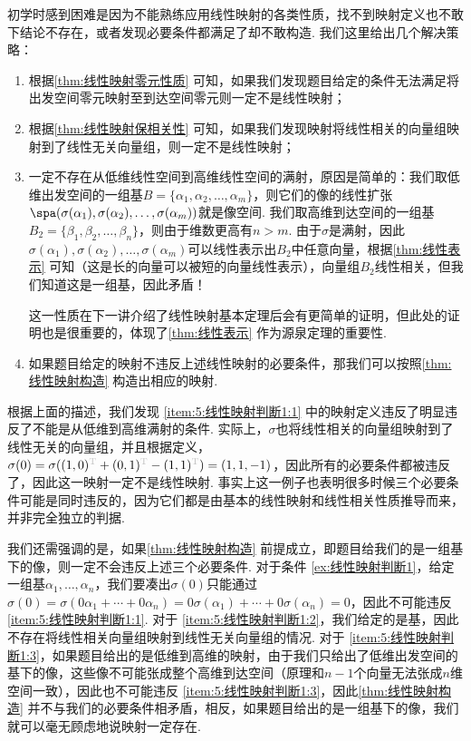 初学时感到困难是因为不能熟练应用线性映射的各类性质，找不到映射定义也不敢下结论不存在，或者发现必要条件都满足了却不敢构造. 我们这里给出几个解决策略：
\begin{enumerate}
    \item \label{item:5:线性映射判断1:1}
          根据\autoref{thm:线性映射零元性质} 可知，如果我们发现题目给定的条件无法满足将出发空间零元映射至到达空间零元则一定不是线性映射；

    \item \label{item:5:线性映射判断1:2}
          根据\autoref{thm:线性映射保相关性} 可知，如果我们发现映射将线性相关的向量组映射到了线性无关向量组，则一定不是线性映射；

    \item \label{item:5:线性映射判断1:3}
          一定不存在从低维线性空间到高维线性空间的满射，原因是简单的：我们取低维出发空间的一组基$B=\{\alpha_1,\alpha_2,\ldots,\alpha_m\}$，则它们的像的线性扩张$\spa(\sigma(\alpha_1),\sigma(\alpha_2),\ldots,\sigma(\alpha_m))$就是像空间. 我们取高维到达空间的一组基$B_2=\{\beta_1,\beta_2,\ldots,\beta_n\}$，则由于维数更高有$n>m$. 由于$\sigma$是满射，因此$\sigma(\alpha_1),\sigma(\alpha_2),\ldots,\sigma(\alpha_m)$可以线性表示出$B_2$中任意向量，根据\autoref{thm:线性表示} 可知（这是长的向量可以被短的向量线性表示），向量组$B_2$线性相关，但我们知道这是一组基，因此矛盾！

          这一性质在下一讲介绍了线性映射基本定理后会有更简单的证明，但此处的证明也是很重要的，体现了\autoref{thm:线性表示} 作为源泉定理的重要性.

    \item 如果题目给定的映射不违反上述线性映射的必要条件，那我们可以按照\autoref{thm:线性映射构造} 构造出相应的映射.
\end{enumerate}

根据上面的描述，我们发现 \ref*{item:5:线性映射判断1:1} 中的映射定义违反了明显违反了不能是从低维到高维满射的条件. 实际上，$\sigma$也将线性相关的向量组映射到了线性无关的向量组，并且根据定义，$\sigma(0)=\sigma((1,0)^{\color{lightgray}\mathrm{T}}+(0,1)^{\color{lightgray}\mathrm{T}}-(1,1)^{\color{lightgray}\mathrm{T}})=(1,1,-1)$，因此所有的必要条件都被违反了，因此这一映射一定不是线性映射. 事实上这一例子也表明很多时候三个必要条件可能是同时违反的，因为它们都是由基本的线性映射和线性相关性质推导而来，并非完全独立的判据.

我们还需强调的是，如果\autoref{thm:线性映射构造} 前提成立，即题目给我们的是一组基下的像，则一定不会违反上述三个必要条件. 对于条件 \ref*{ex:线性映射判断1}，给定一组基$\alpha_1,\ldots,\alpha_n$，我们要凑出$\sigma(0)$只能通过$\sigma(0)=\sigma(0\alpha_1+\cdots+0\alpha_n)=0\sigma(\alpha_1)+\cdots+0\sigma(\alpha_n)=0$，因此不可能违反  \ref*{item:5:线性映射判断1:1}. 对于 \ref*{item:5:线性映射判断1:2}，我们给定的是基，因此不存在将线性相关向量组映射到线性无关向量组的情况. 对于 \ref*{item:5:线性映射判断1:3}，如果题目给出的是低维到高维的映射，由于我们只给出了低维出发空间的基下的像，这些像不可能张成整个高维到达空间（原理和$n-1$个向量无法张成$n$维空间一致），因此也不可能违反 \ref*{item:5:线性映射判断1:3}，因此\autoref{thm:线性映射构造} 并不与我们的必要条件相矛盾，相反，如果题目给出的是一组基下的像，我们就可以毫无顾虑地说映射一定存在.

